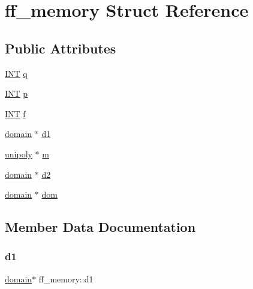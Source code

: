 \hypertarget{structff__memory}{}\section{ff\+\_\+memory Struct Reference}
\label{structff__memory}
\subsection*{Public Attributes}
\begin{DoxyCompactItemize}
\item 
\mbox{\hyperlink{galois_8h_a09fddde158a3a20bd2dcadb609de11dc}{I\+NT}} \mbox{\hyperlink{structff__memory_ac1275d48cbb751e258e3b31030e1e9c7}{q}}
\item 
\mbox{\hyperlink{galois_8h_a09fddde158a3a20bd2dcadb609de11dc}{I\+NT}} \mbox{\hyperlink{structff__memory_a1d6629646ae3154dfa906adcd8e29102}{p}}
\item 
\mbox{\hyperlink{galois_8h_a09fddde158a3a20bd2dcadb609de11dc}{I\+NT}} \mbox{\hyperlink{structff__memory_a9dcab881bb66b7275df01f0fa009b6fc}{f}}
\item 
\mbox{\hyperlink{classdomain}{domain}} $\ast$ \mbox{\hyperlink{structff__memory_a6be7c02fa63483703a869be3ace8e3f9}{d1}}
\item 
\mbox{\hyperlink{classunipoly}{unipoly}} $\ast$ \mbox{\hyperlink{structff__memory_a7bcdf4176355a4aaf1196db13ff7f48a}{m}}
\item 
\mbox{\hyperlink{classdomain}{domain}} $\ast$ \mbox{\hyperlink{structff__memory_a718cd2fe99253914fd3385cb31dcb8e6}{d2}}
\item 
\mbox{\hyperlink{classdomain}{domain}} $\ast$ \mbox{\hyperlink{structff__memory_a3d0d4f9463a55e723512b85701ccb7f9}{dom}}
\end{DoxyCompactItemize}


\subsection{Member Data Documentation}
\mbox{\label{structff__memory_a6be7c02fa63483703a869be3ace8e3f9}} 
\subsubsection{\texorpdfstring{d1}{d1}}
{\footnotesize\ttfamily \mbox{\hyperlink{classdomain}{domain}}$\ast$ ff\+\_\+memory\+::d1}

